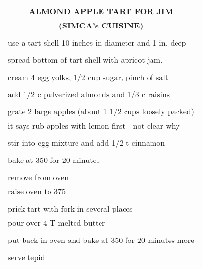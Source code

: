 \documentclass[8pt]{report}
\begin{document}
\begin{tabular}{|l|} \hline	%
 
\multicolumn{1}{|c|}{\textbf{ALMOND APPLE TART FOR JIM}}\\
\multicolumn{1}{|c|}{\textbf{(SIMCA's CUISINE)}}
\\
\\

\index{desserts!almond apple tart for jim (simca's cuisine)}
\index{almond apple tart for jim} \index{apple!almond apple tart}
\index{tart!almond apple}


use a tart shell 10 inches in diameter and 1 in. deep\\
\\
spread bottom of tart shell with apricot jam.\\
\\
cream 4 egg yolks, 1/2 cup sugar, pinch of salt\\
\\
add 1/2 c pulverized almonds and 1/3 c raisins\\
\\
grate 2 large apples (about 1 1/2 cups loosely packed)\\
it says rub apples with lemon first - not clear why\\
\\
stir into egg mixture and add 1/2 t cinnamon\\
\\
bake at 350 for 20 minutes\\
\\
remove from oven\\
raise oven to 375\\
\\
prick tart with fork in several places\\
pour over 4 T melted butter\\
\\
put back in oven and bake at 350 for 20 minutes more\\
\\
serve tepid\\

\hline

\end{tabular}
\end{document}
